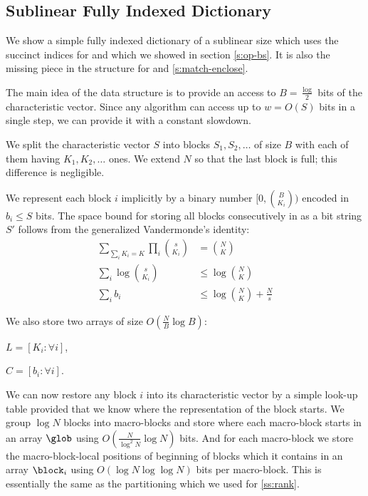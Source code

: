 \subsection{Sublinear Fully Indexed Dictionary}\label{ss:sublinear-fid}


We show a simple fully indexed dictionary of a sublinear size which uses the succinct indices for \rank{} and \select{} which we showed in section \ref{s:op-bs}.
It is also the missing piece in the structure for \match{} and \enclose{} \ref{s:match-enclose}.

The main idea of the data structure is to provide an access to $B = \frac{\log}{2}$ bits of the characteristic vector.
Since any algorithm can access up to $w = O(S)$ bits in a single step, we can provide it with a constant slowdown.

We split the characteristic vector $S$ into blocks $S_1, S_2, \ldots$ of size $B$ with each of them having $K_1, K_2, \ldots$ ones.
We extend $N$ so that the last block is full; this difference is negligible.

We represent each block $i$ implicitly by a binary number $[0, {B \choose K_i})$ encoded in $b_i \le S$ bits.
The space bound for storing all blocks consecutively in as a bit string $S'$ follows from the generalized Vandermonde's identity:
\begin{align*}
	\sum_{\sum_i K_i = K} \prod_i {s \choose K_i} &= {N \choose K} \\
	\sum_i \log {s \choose K_i} &\le \log {N \choose K} \\
	\sum_i b_i &\le \log {N \choose K} + \frac{N}{s}
\end{align*}

We also store two arrays of size $O(\frac{N}{B} \log B)$:
\begin{iteminline}
	\item $L = [K_i : \forall i]$,
	\item $C = [b_i : \forall i]$.
\end{iteminline}

We can now restore any block $i$ into its characteristic vector by a simple look-up table provided that we know where the representation of the block starts.
We group $\log N$ blocks into macro-blocks and store where each macro-block starts in an array $\glob$ using $O(\frac{N}{\log^2 N} \log N)$ bits.
And for each macro-block we store the macro-block-local positions of beginning of blocks which it contains in an array $\block_i$ using $O(\log N \log \log N)$ bits per macro-block.
This is essentially the same as the partitioning which we used for \rank{} \ref{ss:rank}.

